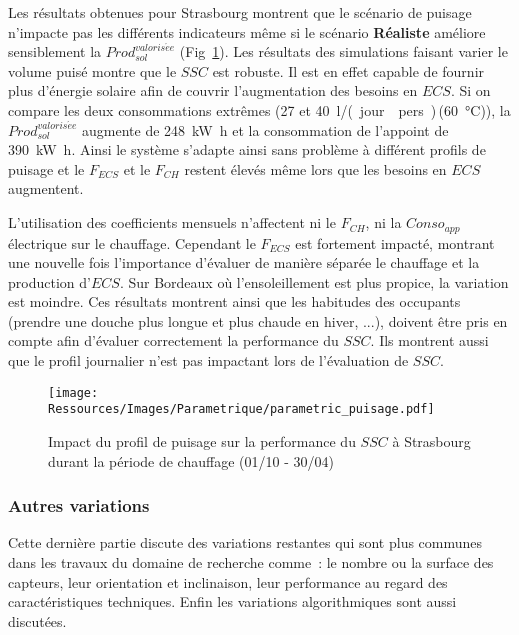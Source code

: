 Les résultats obtenues pour Strasbourg montrent que le scénario de puisage n’impacte pas
les différents indicateurs même si le scénario \textbf{Réaliste} améliore sensiblement la
$Prod_{sol}^{valoris\acute ee}$ (Fig~\ref{fig:impact_profil_puisage}). Les résultats des
simulations faisant varier le volume puisé montre que le $SSC$ est robuste. Il est en
effet capable de fournir plus d’énergie solaire afin de couvrir l’augmentation des besoins
en $ECS$. Si on compare les deux consommations extrêmes (\num{27} et
\SI{40}{\litre/(jour\period pers)}\,(\SI{60}{\celsius})), la $Prod_{sol}^{valoris\acute
ee}$ augmente de \SI{248}{\kilo\watt\hour} et la consommation de l’appoint de \SI{390}{\kilo\watt\hour}.
Ainsi le système s’adapte ainsi sans problème à différent profils de puisage et le
$F_{ECS}$ et le $F_{CH}$ restent élevés même lors que les besoins en $ECS$ augmentent.

L’utilisation des coefficients mensuels n’affectent ni le $F_{CH}$, ni la $Conso_{app}$
électrique sur le chauffage. Cependant le $F_{ECS}$ est fortement impacté, montrant une
nouvelle fois l’importance d’évaluer de manière séparée le chauffage et la production
d’$ECS$. Sur Bordeaux où l’ensoleillement est plus propice, la variation est moindre. Ces
résultats montrent ainsi que les habitudes des occupants (prendre une douche plus longue
et plus chaude en hiver, ...), doivent être pris en compte afin d’évaluer correctement la
performance du $SSC$. Ils montrent aussi que le profil journalier n’est pas impactant lors
de l’évaluation de $SSC$.

\begin{figure}
    \begin{center}
        \texttt{[image: Ressources/Images/Parametrique/parametric\_puisage.pdf]}
    \end{center}
    \caption{Impact du profil de puisage sur la performance
             du $SSC$ à Strasbourg durant la période de chauffage (01/10 - 30/04)
             \label{fig:impact_profil_puisage}}
\end{figure}


\subsubsection{Autres variations} %
\label{ssub:autres_variations}
Cette dernière partie discute des variations restantes qui sont plus communes dans
les travaux du domaine de recherche comme~: le nombre ou la surface des capteurs, leur
orientation et inclinaison, leur performance au regard des caractéristiques techniques.
Enfin les variations algorithmiques sont aussi discutées.

